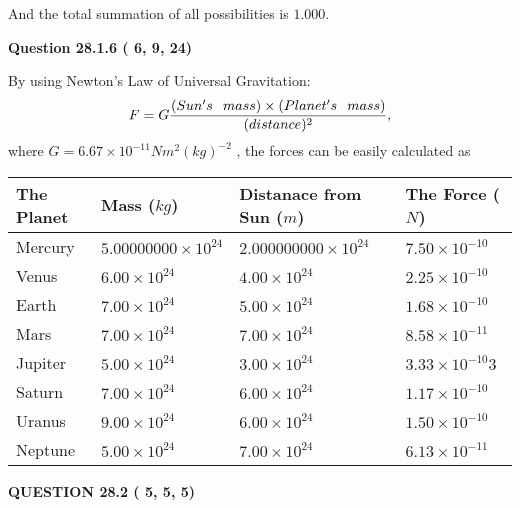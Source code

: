 \documentclass[12pt]{article}
\begin{document}
\noindent
 And the total summation of all possibilities is $  %
1.000 $.
 
  
  
{\textbf{\large{Question
28.1.6 
 (          6,          9,         24)
}}}

By using Newton's Law of Universal Gravitation:
\[
F=G \frac{(Sun's \hspace{0.1in} mass) \times (Planet's \hspace{0.1in} mass)} { (distance)^2},
\]
where
$ G= %
6.67 \times 10^{-11} N m^{2}(kg)^{-2}$ , the forces can be easily calculated as
 
\vspace{0.2in}
 
 
\begin{tabular}{|l|l|l|l|}
\hline
The Planet & Mass ($kg$) & Distanace from Sun ($m$) & The Force ($N$)\\
\hline
Mercury  &
           $ %
5.00000000 \times 10^{24}  $   &
             $ %
2.000000000 \times 10^{24}$    & $ %
7.50 \times 10^{-10} $
\\  \hline
Venus    &
           $  %
6.00 \times 10^{24}  $     &
             $ %
4.00 \times 10^{24} $    & $ %
2.25 \times 10^{-10} $
\\  \hline
Earth    &
           $  %
7.00 \times 10^{24}$     &
             $ %
5.00 \times 10^{24} $    & $ %
1.68 \times 10^{-10} $
\\   \hline
Mars     &
           $  %
7.00 \times 10^{24} $     &
             $ %
7.00 \times 10^{24}$    & $ %
8.58 \times 10^{-11} $
\\   \hline
Jupiter  &
           $  %
5.00 \times 10^{24}  $    &
             $ %
3.00 \times 10^{24} $    & $ %
3.33 \times 10^{-10}3 $
\\  \hline
Saturn   &
           $  %
7.00 \times 10^{24}   $    &
             $ %
6.00 \times 10^{24}  $    & $ %
1.17 \times 10^{-10} $
\\  \hline
Uranus   &
           $  %
9.00 \times 10^{24} $    &
             $ %
6.00 \times 10^{24}$    & $ %
1.50 \times 10^{-10} $
\\  \hline
Neptune  &
           $  %
5.00 \times 10^{24}  $    &
             $ %
7.00 \times 10^{24} $    & $ %
6.13 \times 10^{-11} $
\\  \hline
 
\end{tabular}
 
 
  
  
{\textbf{\large{QUESTION
28.2 
 (          5,          5,          5)
}}}
\end{document}
